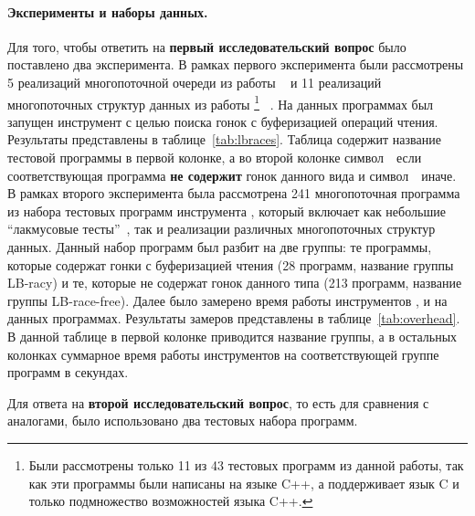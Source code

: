 \paragraph{Эксперименты и наборы данных.} 

Для того, чтобы ответить на \textbf{первый исследовательский вопрос} 
было поставлено два эксперимента. 
В рамках первого эксперимента были рассмотрены 
5 реализаций многопоточной очереди из работы%
~\cite{Kokologiannakis:PLDI2019}
и 11 реализаций многопоточных структур данных из работы%
\footnote{Были рассмотрены только 11 из 43 
тестовых программ из данной работы, 
так как эти программы были написаны на языке C++,
а \genmc поддерживает язык C и только подмножество возможностей языка C++.}
~\cite{Ou-Demsky:OOPSLA18}.
На данных программах был запущен инструмент \wmc с целью 
поиска гонок с буферизацией операций чтения.
Результаты представлены в таблице~\ref{tab:lbraces}.
Таблица содержит название тестовой программы в первой колонке, 
а во второй колонке символ~\cmark~если соответствующая 
программа \textbf{не содержит} гонок данного вида 
и символ~\xmark~иначе.
В рамках второго эксперимента была рассмотрена 241 многопоточная программа 
из набора тестовых программ инструмента \genmc, 
который включает как небольшие ``лакмусовые тесты''~\cite{Alglave-al:TACAS2011}, 
так и реализации различных многопоточных структур данных.
Данный набор программ был разбит на две группы:
те программы, которые содержат гонки с буферизацией чтения 
(28 программ, название группы LB-racy)
и те, которые не содержат гонок данного типа 
(213 программ, название группы LB-race-free).
Далее было замерено время работы инструментов \genmc, \hmc и \wmc на данных программах.  
Результаты замеров представлены в таблице~\ref{tab:overhead}.
В данной таблице в первой колонке приводится название группы, 
а в остальных колонках суммарное время работы инструментов 
на соответствующей группе программ в секундах.





Для ответа на \textbf{второй исследовательский вопрос}, 
то есть для сравнения \wmc с аналогами, 
было использовано два тестовых набора программ.

